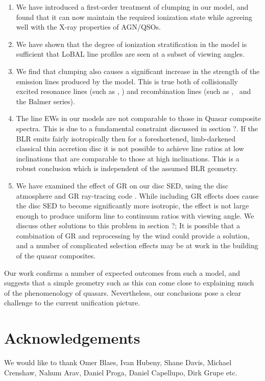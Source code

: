 \documentclass[preprint, a4paper, 11pt]{aastex}
\begin{document}
\begin{enumerate}
\item We have introduced a first-order treatment 
of clumping in our model, and found that it can now maintain
the required ionization state while agreeing well with the X-ray
properties of AGN/QSOs.
\smallskip
\item We have shown that the degree of ionization stratification
in the model is sufficient that LoBAL line profiles
are seen at a subset of viewing angles. 
\smallskip
\item We find that clumping also causes a significant 
increase in the strength of the  emission
lines produced by the model. This is true both
of collisionally excited resonance lines (such as \civ, \nv)
and recombination lines (such as \la, \ha\ and the Balmer series).
\smallskip
\item The line EWs in our models are not comparable to those in Quasar composite
spectra. This is due to a fundamental constraint discussed in section ?. If the BLR
emits fairly isotropically then for a foreshortened, limb-darkened classical thin accretion disc
it is not possible to achieve line ratios at low inclinations that are comparable to
those at high inclinations. This is a robust conclusion which 
is independent of the assumed BLR geometry. 
\smallskip
\item We have examined the effect of GR on our disc SED, using the disc atmosphere
and GR ray-tracing code \agn. While including GR effects
does cause the disc SED to become significantly more isotropic,
the effect is not large enough to produce uniform line to continuum ratios
with viewing angle. We discuss other solutions to this problem in section ?; 
It is possible that a combination of GR and reprocessing by the wind could provide a 
solution, and a number of complicated selection effects may be at work
in the building of the quasar composites.
\end{enumerate}

Our work confirms a number of expected outcomes from such a model, and suggests 
that a simple geometry such as this can come close to explaining much of the 
phenomenology of quasars. Nevertheless, our conclusions pose a clear challenge 
to the current unification picture.


\section*{Acknowledgements}

We would like to thank Omer Blaes, Ivan Hubeny, Shane Davis, 
Michael Crenshaw, Nahum Arav, Daniel Proga, Daniel Capellupo, Dirk Grupe etc.




\newpage
\end{document}

